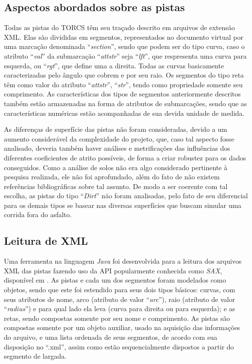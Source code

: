 \documentclass[conference]{IEEEtran}
\begin{document}
\subsection{Aspectos abordados sobre as pistas}
  Todas as pistas do TORCS têm seu traçado descrito em arquivos de extensão XML. Elas são divididas em segmentos, representados no documento virtual por uma marcação denominada ``\textit{section}'', sendo que podem ser do tipo curva, caso o atributo ``\textit{val}'' da submarcação ``\textit{attstr}'' seja ``\textit{lft}'', que respresenta uma curva para esquerda, ou ``\textit{rgt}'', que define uma a direita. Todas as curvas basicamente caracterizadas pelo ângulo que cobrem e por seu raio. Os segmentos do tipo reta têm como valor do atributo ``\textit{attstr}'', ``\textit{str}'', tendo como propriedade somente seu comprimento. As características dos tipos de segmentos anteriormente descritos também estão armazenadas na forma de atributos de submarcações, sendo que as características numéricas estão acompanhadas de sua devida unidade de medida.
  
  As diferenças de superfície das pistas não foram consideradas, devido a um aumento considerável da complexidade do projeto, que, caso tal aspecto fosse analisado, deveria também haver análises e metrificações das influências dos diferentes coeficientes de atrito possíveis, de forma a criar robustez para os dados conseguidos. Como a análise de solos não era algo considerado pertinente à pesquisa realizada, ele não foi aprofundado, além do fato de não existem referências bibliográficas sobre tal assunto. De modo a ser coerente com tal escolha, as pistas do tipo ``\textit{Dirt}'' não foram analisadas, pelo fato de seu diferencial para os demais tipos se basear nas diversas superfícies que buscam simular uma corrida fora do asfalto. 

\subsection{Leitura de XML}
  	Uma ferramenta na linguagem \textit{Java} foi desenvolvida para a leitura dos arquivos XML das pistas fazendo uso da API popularmente conhecida como \textit{SAX}\cite{SAX}, disponível em \cite{meuGit}. As pistas e cada um dos segmentos foram modelados como objetos, sendo que este foi estendido para seus dois tipos básicos: curvas, com seus atributos de nome, arco (atributo de valor ``\textit{arc}''), raio (atributo de valor ``\textit{radius}'') e para qual lado ela leva (curva para direita ou para esquerda); e as retas, sendo compostas somente por seu nome e comprimento. As pistas são compostas somente por um objeto auxiliar, usado na aquisição das informações do arquivo, e uma lista ordenada de seus segmentos, de acordo com sua disposição no ``.xml'', assim como estão sequencialmente dispostos a partir do segmento de largada. 
  
\end{document}
